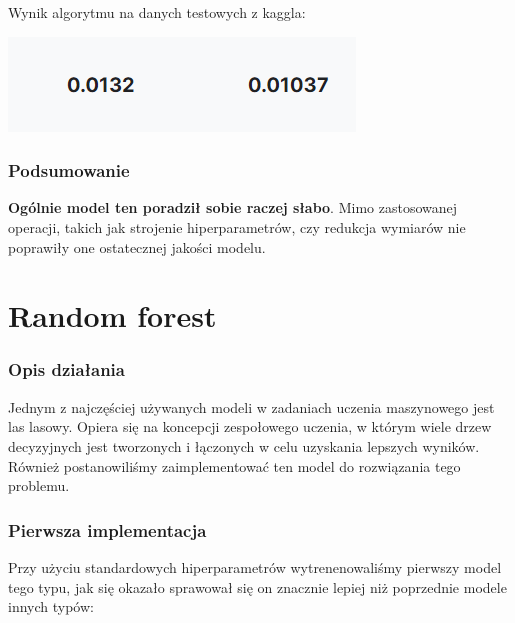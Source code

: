 \documentclass[11pt]{article}
\begin{document}
Wynik algorytmu na danych testowych z kaggla:

\includegraphics{plots/KNN_res.png}

\hypertarget{podsumowanie}{%
\subsubsection{Podsumowanie}\label{podsumowanie}}

\textbf{Ogólnie model ten poradził sobie raczej słabo}. Mimo
zastosowanej operacji, takich jak strojenie hiperparametrów, czy
redukcja wymiarów nie poprawiły one ostatecznej jakości modelu.

    \hypertarget{random-forest}{%
\section{Random forest}\label{random-forest}}

\hypertarget{opis-dziaux142ania}{%
\subsubsection{Opis działania}\label{opis-dziaux142ania}}

Jednym z najczęściej używanych modeli w zadaniach uczenia maszynowego
jest las lasowy. Opiera się na koncepcji zespołowego uczenia, w którym
wiele drzew decyzyjnych jest tworzonych i łączonych w celu uzyskania
lepszych wyników. Również postanowiliśmy zaimplementować ten model do
rozwiązania tego problemu.

\hypertarget{pierwsza-implementacja}{%
\subsubsection{Pierwsza implementacja}\label{pierwsza-implementacja}}

Przy użyciu standardowych hiperparametrów wytrenenowaliśmy pierwszy
model tego typu, jak się okazało sprawował się on znacznie lepiej niż
poprzednie modele innych typów:
\end{document}
